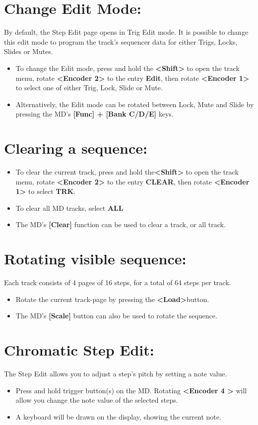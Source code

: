 \section{Change Edit Mode:}
By default, the Step Edit page opens in Trig Edit mode. It is possible to change this edit mode to program the track's sequencer data for either Trigs, Locks, Slides or Mutes.
\begin{itemize}
\item To change the Edit mode, press and hold the \textbf{<Shift>} to open the track menu, rotate \textbf{<Encoder 2>} to the entry \textbf{Edit}, then rotate \textbf{<Encoder 1>} to select one of either Trig, Lock, Slide or Mute.
\item Alternatively, the Edit mode can be rotated between Lock, Mute and Slide by pressing the MD's \textbf{[Func] + [Bank C/D/E]} keys.
\end{itemize}
\newpage
\section{Clearing a sequence:}
\begin{itemize}
\item To clear the current track, press and hold the\textbf{<Shift>} to open the track menu, rotate \textbf{<Encoder 2>} to the entry \textbf{CLEAR}, then rotate \textbf{<Encoder 1>} to select \textbf{TRK}.
\item To clear all MD tracks, select \textbf{ALL}
\item The MD's \textbf{[Clear]} function can be used to clear a track, or all track.
\end{itemize}
\section{Rotating visible sequence:}
Each track consists of 4 pages of 16 steps, for a total of 64 steps per track.
\begin{itemize}
\item Rotate the current track-page by pressing the \textbf{<Load>}button.
\item The MD's \textbf{[Scale]} button can also be used to rotate the sequence.
\end{itemize}
\section{Chromatic Step Edit:}
The Step Edit allows you to adjust a step's pitch by setting a note value. 
\begin{itemize}
\item Press and hold trigger button(s) on the MD. Rotating \textbf{<Encoder 4 >} will allow you change the note value of the selected steps.
\item A keyboard will be drawn on the display, showing the current note.
\end{itemize}
